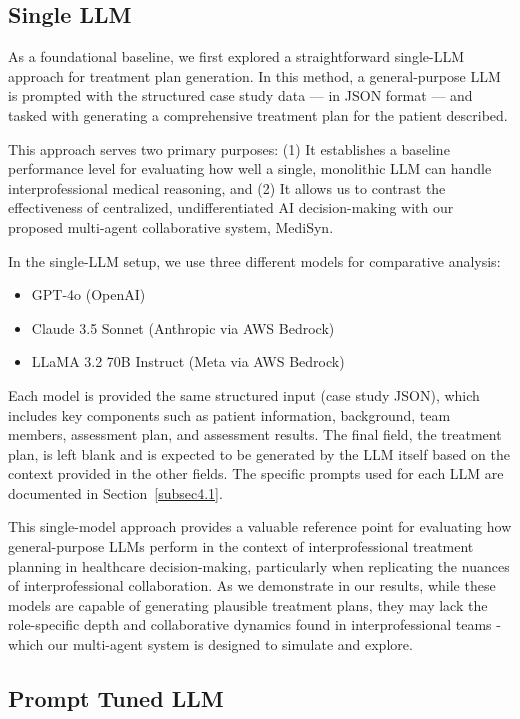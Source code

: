 \documentclass[pdflatex,sn-mathphys-num]{sn-jnl}%
\theoremstyle{thmstyleone}%
\theoremstyle{thmstyletwo}%
\theoremstyle{thmstylethree}%
\begin{document}
\subsection{Single LLM}\label{subsec3.3}

As a foundational baseline, we first explored a straightforward single-LLM approach for treatment plan generation. In this method, a general-purpose LLM is prompted with the structured case study data — in JSON format — and tasked with generating a comprehensive treatment plan for the patient described.

This approach serves two primary purposes:
(1) It establishes a baseline performance level for evaluating how well a single, monolithic LLM can handle interprofessional medical reasoning, and
(2) It allows us to contrast the effectiveness of centralized, undifferentiated AI decision-making with our proposed multi-agent collaborative system, MediSyn.

In the single-LLM setup, we use three different models for comparative analysis: \begin{itemize} \item GPT-4o (OpenAI) \item Claude 3.5 Sonnet (Anthropic via AWS Bedrock) \item LLaMA 3.2 70B Instruct (Meta via AWS Bedrock) \end{itemize}

Each model is provided the same structured input (case study JSON), which includes key components such as patient information, background, team members, assessment plan, and assessment results. The final field, the treatment plan, is left blank and is expected to be generated by the LLM itself based on the context provided in the other fields. The specific prompts used for each LLM are documented in Section~\ref{subsec4.1}.

This single-model approach provides a valuable reference point for evaluating how general-purpose LLMs perform in the context of interprofessional treatment planning in healthcare decision-making, particularly when replicating the nuances of interprofessional collaboration. As we demonstrate in our  results, while these models are capable of generating plausible treatment plans, they may lack the role-specific depth and collaborative dynamics found in interprofessional teams - which our multi-agent system is designed to simulate and explore.

\subsection{Prompt Tuned LLM}\label{subsec3.4}
\end{document}
